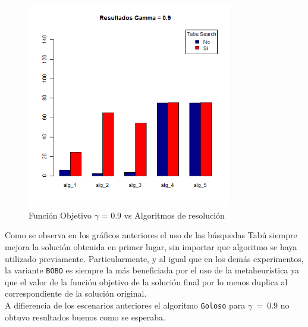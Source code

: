 \begin{figure}[H]
  \centering
    \includegraphics[width=0.8\textwidth]{resultados/affiliations/Graficos_agrupados/gamma09-affiliations.png}
  \caption{Función Objetivo $\gamma$ = $0.9$ vs Algoritmos de resolución}
  \label{res:img-affiliations-agr-gamma09}
\end{figure}

Como se observa en los gráficos anteriores el uso de las búsquedas Tabú siempre mejora la solución obtenida en primer lugar, sin importar que algoritmo se haya utilizado previamente. Particularmente, y al igual que en los demás experimentos, la variante \texttt{BOBO} es siempre la más beneficiada por el uso de la metaheurística ya que el valor de la función objetivo de la solución final por lo menos duplica al correspondiente de la solución original.\\
A difierencia de los escenarios anteriores el algoritmo \texttt{Goloso} para $\gamma\ =\ 0.9$ no obtuvo resultados buenos como se esperaba.
\newpage
